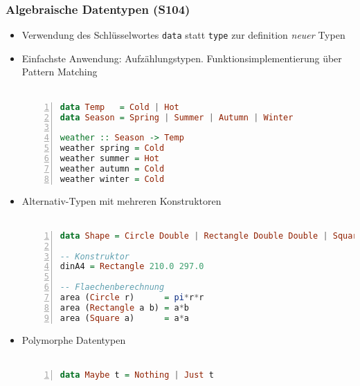 \subsubsection{Algebraische Datentypen (S104)}
\begin{itemize}
	\item Verwendung des Schlüsselwortes \texttt{data} statt \texttt{type} zur definition \textit{neuer} Typen
	\item Einfachste Anwendung: Aufzählungstypen. Funktionsimplementierung über Pattern Matching\\\\
	\begin{minipage}{\linewidth}
	\begin{lstlisting}[frame=single,numbers=left,mathescape,language=Haskell]
data Temp   = Cold | Hot
data Season = Spring | Summer | Autumn | Winter

weather :: Season -> Temp
weather spring = Cold
weather summer = Hot
weather autumn = Cold
weather winter = Cold
	\end{lstlisting}
	\end{minipage}
	\item Alternativ-Typen mit mehreren Konstruktoren\\\\
	\begin{minipage}{\linewidth}
	\begin{lstlisting}[frame=single,numbers=left,mathescape,language=Haskell]
data Shape = Circle Double | Rectangle Double Double | Square Double

-- Konstruktor
dinA4 = Rectangle 210.0 297.0

-- Flaechenberechnung
area (Circle r)      = pi*r*r
area (Rectangle a b) = a*b
area (Square a)      = a*a
	\end{lstlisting}
	\end{minipage}
	\item Polymorphe Datentypen\\\\ %
	\begin{minipage}{\linewidth}
	\begin{lstlisting}[frame=single,numbers=left,mathescape,language=Haskell]
data Maybe t = Nothing | Just t
	\end{lstlisting}
	\end{minipage}
\end{itemize}

